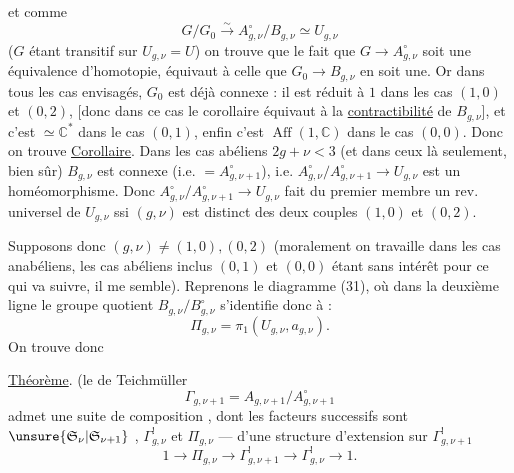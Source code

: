 et comme
\[
G/G_0\xrightarrow{\sim}A_{g,\nu}^{\circ}/B_{g,\nu}\simeq U_{g,\nu}
\]
($G$ étant transitif sur $U_{g,\nu}=U$) on trouve que le fait que $G\longrightarrow A_{g,\nu}^{\circ}$ soit une équivalence d'homotopie, équivaut à celle que $G_0\longrightarrow B_{g,\nu}$ en soit une. Or dans tous les cas envisagés, $G_0$ est déjà connexe : il est réduit à $1$ dans les cas $(1,0)$ et $(0,2)$, [donc dans ce cas le corollaire équivaut à la \uline{contractibilité} de $B_{g,\nu}$], et c'est $\simeq\mathbb C^*$ dans le cas $(0,1)$, enfin c'est $\operatorname{Aff}(1,\mathbb C)$ dans le cas $(0,0)$. Donc on trouve
\uline{Corollaire}. Dans les cas abéliens $2g+\nu<3$ (et dans ceux là seulement, bien sûr) $B_{g,\nu}$ est connexe (i.e. $=A_{g,\nu+1}^{\circ}$), i.e. $A_{g,\nu}^{\circ}/A_{g,\nu+1}^{\circ}\longrightarrow U_{g,\nu}$ est un homéomorphisme. Donc $A_{g,\nu}^{\circ}/A_{g,\nu+1}^{\circ}\longrightarrow U_{g,\nu}$ fait du premier membre un rev. universel de $U_{g,\nu}$ ssi $(g,\nu)$ est distinct des deux couples $(1,0)$ et $(0,2)$.

Supposons donc $(g,\nu)\ne(1,0),(0,2)$ (moralement on travaille dans les cas anabéliens, les cas  abéliens inclus $(0,1)$ et $(0,0)$ étant  sans intérêt pour ce qui va suivre, il me semble). Reprenons le diagramme (31), où dans la deuxième ligne le groupe quotient $B_{g,\nu}/B_{g,\nu}^{\circ}$ s'identifie donc à :
\[
\Pi_{g,\nu}=\pi_1(U_{g,\nu},a_{g,\nu}).
\]
On trouve donc

\uline{Théorème}.  (le   de Teichmüller
\[
\Gamma_{g,\nu+1}=A_{g,\nu+1}/A_{g,\nu+1}^{\circ}
\]
admet une suite de composition , dont les facteurs successifs sont $\unsure{\mathfrak S_\nu|\mathfrak S_{\nu+1}}$ , $\Gamma_{g,\nu}^{!}$ et $\Pi_{g,\nu}$ ---  d'une structure
d'extension sur $\Gamma_{g,\nu+1}^{!}$
\[
\tag{41}
1\longrightarrow\Pi_{g,\nu}\longrightarrow\Gamma_{g,\nu+1}^{!}
\longrightarrow\Gamma_{g,\nu}^{!}\longrightarrow1.
\]

